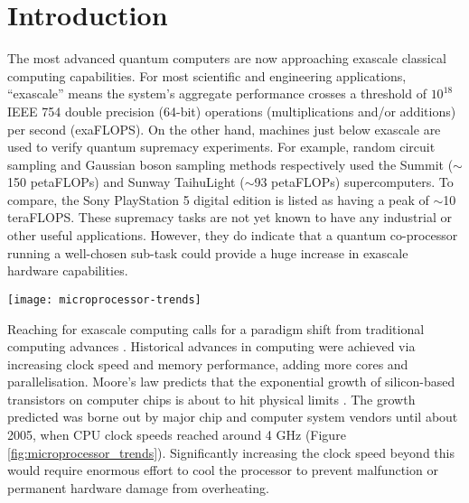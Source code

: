 \documentclass[10pt]{iopart}
\begin{document}
\tableofcontents 
{}

\section{Introduction}\label{sec:introduction}

The most advanced quantum computers are now approaching exascale classical computing capabilities. For most scientific and engineering applications, ``exascale'' means the system's aggregate performance crosses a threshold of $10^{18}$ IEEE 754 double precision (64-bit) operations (multiplications and/or additions) per second (exaFLOPS). On the other hand, machines just below exascale are used to verify quantum supremacy experiments. For example, random circuit sampling and Gaussian boson sampling methods respectively used the Summit ($\sim$150 petaFLOPs) \cite{Arute2019} and Sunway TaihuLight ($\sim$93 petaFLOPs) \cite{Li2022g} supercomputers. To compare, the Sony PlayStation 5 digital edition is listed as having a peak of $\sim$10 teraFLOPS. These supremacy tasks are not yet known to have any industrial or other useful applications. However, they do indicate that a quantum co-processor running a well-chosen sub-task could provide a huge increase in exascale hardware capabilities.

\begin{figure*}[ht!]
\centering
\texttt{[image: microprocessor-trends]}
\caption{Microprocessor trend data, 1980-2021. Data up to year 2010 collected by M. Horowitz, F. Labonte, O. Shacham, K. Olukotun, L. Hammond, and C. Batten, data for 2010-2021 by K. Rupp \cite{Rupp2022}.}
\label{fig:microprocessor_trends}
\end{figure*}

Reaching for exascale computing calls for a paradigm shift from traditional computing advances \cite{Mann2020,Betcke2022}. Historical advances in computing were achieved via increasing clock speed and memory performance, adding more cores and parallelisation. Moore's law \cite{Moore1965} predicts that the exponential growth of silicon-based transistors on computer chips is about to hit physical limits \cite{Khan2018,Leiserson2020}. The growth predicted was borne out by major chip and computer system vendors until about 2005, when CPU clock speeds reached around 4 GHz (Figure \ref{fig:microprocessor_trends}). Significantly increasing the clock speed beyond this would require enormous effort to cool the processor to prevent malfunction or permanent hardware damage from overheating.
\end{document}

